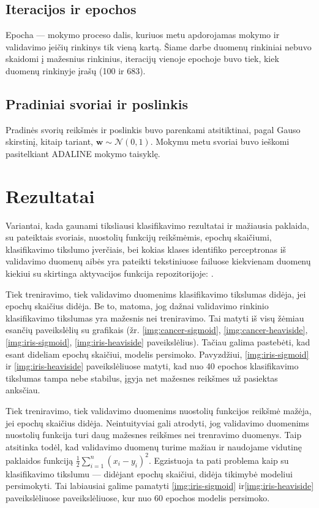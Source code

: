 \documentclass{VUMIFPSbakalaurinis}
\begin{document}
\subsection{Iteracijos ir epochos}
Epocha — mokymo proceso dalis, kuriuos metu apdorojamas mokymo ir validavimo įeičių rinkinys tik vieną kartą.
Šiame darbe duomenų rinkiniai nebuvo skaidomi į mažesnius rinkinius, 
iteracijų vienoje epochoje buvo tiek, kiek duomenų rinkinyje įrašų (100 ir 683).

\subsection{Pradiniai svoriai ir poslinkis}
Pradinės svorių reikšmės ir poslinkis buvo parenkami atsitiktinai, pagal Gauso skirstinį,
kitaip tariant, $ \mathbf{w} \sim \mathcal{N}(0, 1)$.
Mokymu metu svoriai buvo ieškomi pasitelkiant ADALINE mokymo taisyklę.


\section{Rezultatai}
Variantai, kada gaunami tiksliausi klasifikavimo rezultatai
ir mažiausia paklaida, su pateiktais svoriais, nuostolių funkcijų reikšmėmis,
epochų skaičiumi, klasifikavimo tikslumo įverčiais, bei kokias
klases identifiko perceptronas iš validavimo duomenų aibės
yra pateikti tekstiniuose failuose kiekvienam duomenų kiekiui
su skirtinga aktyvacijos funkcija repozitorijoje: \href{https://github.com/ArmintasP/Computational-intelligence/tree/main/Lab2/Results}
{\color{cyan}{https://github.com/ArmintasP/Computational-intelligence/tree/main/Lab2/Results}}.

Tiek treniravimo, tiek validavimo duomenims klasifikavimo tikslumas
didėja, jei epochų skaičius didėja. Be to,
matoma, jog dažnai validavimo rinkinio klasifikavimo tikslumas yra
mažesnis nei treniravimo. Tai matyti iš visų žėmiau
esančių paveikslėlių su grafikais
(žr. \ref{img:cancer-sigmoid}, \ref{img:cancer-heaviside},
\ref{img:iris-sigmoid}, \ref{img:iris-heaviside} paveikslėlius).
Tačiau galima pastebėti, kad esant dideliam epochų skaičiui,
modelis persimoko. Pavyzdžiui, \ref{img:iris-sigmoid} ir
\ref{img:iris-heaviside} paveikslėliuose matyti, kad 
nuo 40 epochos klasifikavimo tikslumas tampa nebe stabilus,
įgyja net mažesnes reikšmes už pasiektas anksčiau. 


Tiek treniravimo, tiek validavimo duomenims nuostolių funkcijos
reikšmė mažėja, jei epochų skaičius didėja. Neintuityviai gali atrodyti,
jog validavimo duomenims nuostolių funkcija turi daug mažesnes reikšmes
nei trenravimo duomenys. Taip atsitinka todėl, kad validavimo duomenų
turime mažiau ir naudojame vidutinę paklaidos funkciją 
$\frac{1}{2} \sum_{i=1}^{n}(x_i-y_i)^2$.
Egzistuoja ta pati problema kaip su klasifikavimo tikslumu —
didėjant epochų skaičiui, didėja tikimybė modeliui persimokyti.
Tai labiausiai galime pamatyti \ref{img:iris-sigmoid} ir\ref{img:iris-heaviside} paveikslėliuose
paveikslėliuose, kur nuo 60 epochos modelis persimoko.
\end{document}
